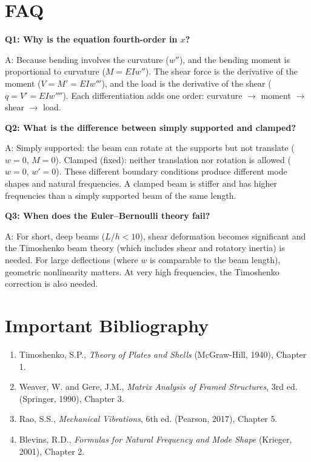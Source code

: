 \section*{FAQ}

\textbf{Q1: Why is the equation fourth-order in $x$?}

A: Because bending involves the curvature ($w''$), and the bending moment is proportional to curvature ($M = EIw''$). The shear force is the derivative of the moment ($V = M' = EIw'''$), and the load is the derivative of the shear ($q = V' = EIw''''$). Each differentiation adds one order: curvature $\to$ moment $\to$ shear $\to$ load.

\textbf{Q2: What is the difference between simply supported and clamped?}

A: Simply supported: the beam can rotate at the supports but not translate ($w = 0$, $M = 0$). Clamped (fixed): neither translation nor rotation is allowed ($w = 0$, $w' = 0$). These different boundary conditions produce different mode shapes and natural frequencies. A clamped beam is stiffer and has higher frequencies than a simply supported beam of the same length.

\textbf{Q3: When does the Euler--Bernoulli theory fail?}

A: For short, deep beams ($L/h < 10$), shear deformation becomes significant and the Timoshenko beam theory (which includes shear and rotatory inertia) is needed. For large deflections (where $w$ is comparable to the beam length), geometric nonlinearity matters. At very high frequencies, the Timoshenko correction is also needed.
\section*{Important Bibliography}

\begin{enumerate}
\item Timoshenko, S.P., \textit{Theory of Plates and Shells} (McGraw-Hill, 1940), Chapter 1.
\item Weaver, W. and Gere, J.M., \textit{Matrix Analysis of Framed Structures}, 3rd ed. (Springer, 1990), Chapter 3.
\item Rao, S.S., \textit{Mechanical Vibrations}, 6th ed. (Pearson, 2017), Chapter 5.
\item Blevins, R.D., \textit{Formulas for Natural Frequency and Mode Shape} (Krieger, 2001), Chapter 2.
\end{enumerate}

